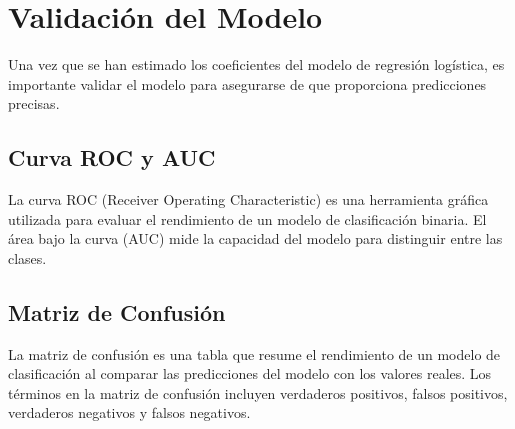 \section{Validaci\'on del Modelo}

Una vez que se han estimado los coeficientes del modelo de regresi\'on log\'istica, es importante validar el modelo para asegurarse de que proporciona predicciones precisas.

\subsection{Curva ROC y AUC}

La curva ROC (Receiver Operating Characteristic) es una herramienta gr\'afica utilizada para evaluar el rendimiento de un modelo de clasificaci\'on binaria. El \'area bajo la curva (AUC) mide la capacidad del modelo para distinguir entre las clases.

\subsection{Matriz de Confusi\'on}

La matriz de confusi\'on es una tabla que resume el rendimiento de un modelo de clasificaci\'on al comparar las predicciones del modelo con los valores reales. Los t\'erminos en la matriz de confusi\'on incluyen verdaderos positivos, falsos positivos, verdaderos negativos y falsos negativos.

